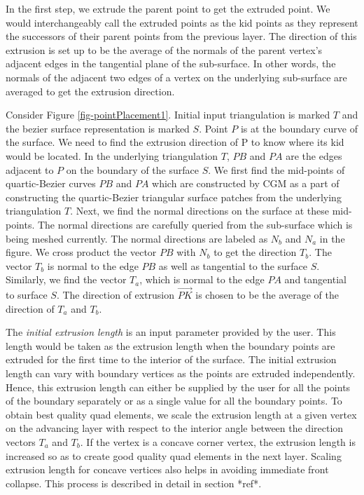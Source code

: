 In the first step, we extrude the parent point to get the extruded point. We would interchangeably call the extruded points as the kid points as they represent the successors of their parent points from the previous layer. The direction of this extrusion is set up to be the average of the normals of the parent vertex's adjacent edges in the tangential plane of the sub-surface. In other words, the normals of the adjacent two edges of a vertex on the underlying sub-surface are averaged to get the extrusion direction.

Consider Figure \ref{fig-pointPlacement1}. Initial input triangulation is marked $T$ and the bezier surface representation is marked $S$. Point $P$ is at the boundary curve of the surface. We need to find the extrusion direction of P to know where its kid would be located. In the underlying triangulation $T$, $PB$ and $PA$ are the edges adjacent to $P$ on the boundary of the surface $S$. We first find the mid-points of quartic-Bezier curves $PB$ and $PA$ which are constructed by CGM as a part of constructing the quartic-Bezier triangular surface patches from the underlying triangulation $T$. Next, we find the normal directions on the surface at these mid-points. The normal directions are carefully queried from the sub-surface which is being meshed currently. The normal directions are labeled as $N_b$ and $N_a$ in the figure. We cross product the vector $PB$ with $N_b$ to get the direction $T_b$. The vector $T_b$ is normal to the edge $PB$ as well as tangential to the surface $S$. Similarly, we find the vector $T_a$, which is normal to the edge $PA$ and tangential to surface $S$. The direction of extrusion $\overrightarrow{PK}$ is chosen to be the average of the direction of $T_a$ and $T_b$.

The \textit{initial extrusion length} is an input parameter provided by the user. This length would be taken as the extrusion length when the boundary points are extruded for the first time to the interior of the surface. The initial extrusion length can vary with boundary vertices as the points are extruded independently. Hence, this extrusion length can either be supplied by the user for all the points of the boundary separately or as a single value for all the boundary points. To obtain best quality quad elements, we scale the extrusion length at a given vertex on the advancing layer with respect to the interior angle between the direction vectors $T_a$ and $T_b$. If the vertex is a concave corner vertex, the extrusion length is increased so as to create good quality quad elements in the next layer. Scaling extrusion length for concave vertices also helps in avoiding immediate front collapse. This process is described in detail in section *ref*.%

